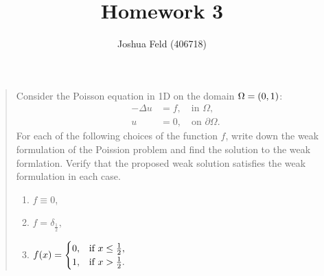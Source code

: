 \documentclass[english]{exercise}
\title{Homework 3}
\author{Joshua Feld (406718)}
\begin{document}
	\maketitle


	\section{}

	\begin{quote}
		Consider the Poisson equation in 1D on the domain \(\Omega = \parentheses*{0, 1}\):
		\begin{align*}
			-\Delta u &= f, \quad \text{in }\Omega,\\
			u &= 0, \quad \text{on }\partial\Omega.
		\end{align*}
		For each of the following choices of the function \(f\), write down the weak formulation of the Poission problem and find the solution to the weak formlation.
		Verify that the proposed weak solution satisfies the weak formulation in each case.
		\begin{enumerate}
			\item \(f \equiv 0\),
			\item \(f = \delta_{\frac{1}{2}}\),
			\item \(f\parentheses*{x} = \begin{cases}
				0, & \text{if }x \le \frac{1}{2},\\
				1, & \text{if }x > \frac{1}{2}.
			\end{cases}\)
		\end{enumerate}
	\end{quote}
\end{document}
